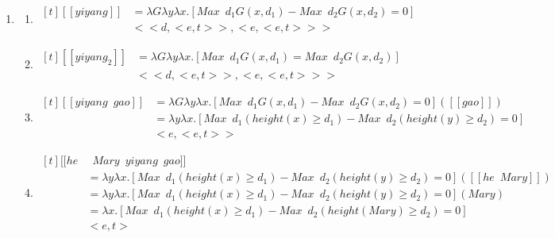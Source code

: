 \documentclass{ctexart}
\begin{document}
\begin{enumerate}
    \item \label{equality_example_3}
    \begin{enumerate}
        \item \label{equality_example_3_a}
        $\begin{aligned}[t]
            [\![yiyang]\!] 
            &= \lambda G \lambda y \lambda x.[Max \enspace d_1 G(x,d_1) -  Max \enspace d_2 G(x,d_2) = 0]\\ &
            <<d,<e,t>>,<e,<e,t>>>
        \end{aligned}$

        \item \label{equality_example_3_a_prime}
        $\begin{aligned}[t]
            [\![yiyang_{2}]\!] 
            &= \lambda G \lambda y \lambda x.[Max \enspace d_1 G(x,d_1) =  Max \enspace d_2 G(x,d_2)]\\ &
            <<d,<e,t>>,<e,<e,t>>>
        \end{aligned}$

        \item \label{equality_example_3_b}
        $\begin{aligned}[t]
            [\![yiyang \enspace gao]\!] 
            &= \lambda G \lambda y \lambda x.[Max \enspace d_1 G(x,d_1) - Max \enspace d_2 G(x,d_2) = 0]([\![gao]\!] ) \\
            &= \lambda y \lambda x.[Max \enspace d_1 (height(x) \geq d_1) - Max \enspace d_2 (height(y) \geq d_2) = 0] \\
            & <e,<e,t>>
        \end{aligned}$

        \item \label{equality_example_3_c}
        $\begin{aligned}[t]
            [\![he &\enspace Mary \enspace yiyang \enspace gao]\!] \\
            &= \lambda y \lambda x.[Max \enspace d_1 (height(x) \geq d_1) - Max \enspace d_2 (height(y) \geq d_2) = 0]([\![he \enspace Mary]\!]) \\
            &= \lambda y \lambda x.[Max \enspace d_1 (height(x) \geq d_1) - Max \enspace d_2 (height(y) \geq d_2) = 0](Mary)  \\
            &= \lambda x.[Max \enspace d_1 (height(x) \geq d_1) - Max \enspace d_2 (height(Mary) \geq d_2) = 0] \\
            & <e,t>
        \end{aligned}$


\end{enumerate}
\end{enumerate}
\end{document}
